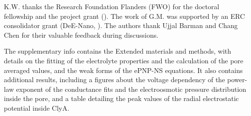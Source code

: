 \documentclass[journal=ancac3,manuscript=article,etalmode=truncate,maxauthors=0,layout=onecolumn]{achemso}
\begin{document}
\begin{acknowledgement}
K.W. thanks the Research Foundation Flanders (FWO) for the doctoral fellowship and the project grant
(). The work of G.M. was supported by an ERC consolidator grant (DeE-Nano, ).
The authors thank Ujjal Barman and Chang Chen for their valuable feedback during discussions.
\end{acknowledgement}

\begin{suppinfo}
	The supplementary info contains the Extended materials and methods, with
	details on the fitting of the electrolyte properties and the calculation of
	the pore averaged values, and the weak forms of the ePNP-NS equations. It also
	contains additional results, including a figures about the voltage dependency
	of the power-law exponent of the conductance fits and the electroosmotic
	pressure distribution inside the pore, and a table detailing the peak values
	of the radial electrostatic potential inside ClyA.
\end{suppinfo}



%
\end{document}
